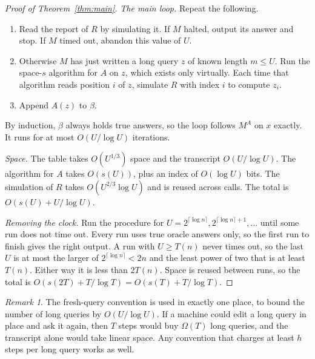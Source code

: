 \documentclass[11pt]{article}
\theoremstyle{remark}
\newtheorem{remark}[theorem]{Remark}
\begin{document}
\begin{proof}[Proof of Theorem~\ref{thm:main}]
\emph{The main loop.}
Repeat the following.
\begin{enumerate}
\item Read the report of $R$ by simulating it. If $M$ halted, output its
answer and stop. If $M$ timed out, abandon this value of $U$.
\item Otherwise $M$ has just written a long query $z$ of known length
$m\le U$. Run the space-$s$ algorithm for $A$ on $z$, which exists only
virtually. Each time that algorithm reads position $i$ of $z$, simulate
$R$ with index $i$ to compute $z_i$.
\item Append $A(z)$ to $\beta$.
\end{enumerate}
By induction, $\beta$ always holds true answers, so the loop follows
$M^A$ on $x$ exactly. It runs for at most $O(U/\log U)$ iterations.

\emph{Space.}
The table takes $O(U^{1/3})$ space and the transcript $O(U/\log U)$. The
algorithm for $A$ takes $O(s(U))$, plus an index of $O(\log U)$ bits.
The simulation of $R$ takes $O(U^{2/3}\log U)$ and is reused across
calls. The total is $O(s(U)+U/\log U)$.

\emph{Removing the clock.}
Run the procedure for $U=2^{\lceil\log n\rceil},2^{\lceil\log n\rceil+1},\dots$
until some run does not time out. Every run uses true oracle answers
only, so the first run to finish gives the right output. A run with
$U\ge T(n)$ never times out, so the last $U$ is at most the larger of
$2^{\lceil\log n\rceil}<2n$ and the least power of two that is at least
$T(n)$. Either way it is less than $2T(n)$. Space is reused between runs,
so the total is $O(s(2T)+T/\log T)=O(s(T)+T/\log T)$.
\end{proof}

\begin{remark}\label{rem:fresh}
The fresh-query convention is used in exactly one place, to bound the
number of long queries by $O(U/\log U)$. If a machine could edit a long
query in place and ask it again, then $T$ steps would buy $\Omega(T)$
long queries, and the transcript alone would take linear space. Any
convention that charges at least $h$ steps per long query works as
well.
\end{remark}
\end{document}
